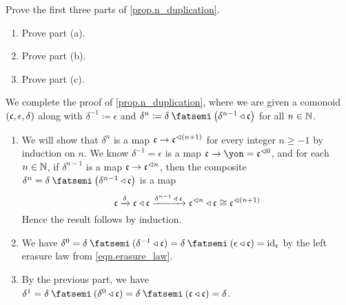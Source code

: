 \documentclass[Book-Poly]{subfiles}
\begin{document}
\begin{exercise} \label{exc.n_duplication}
Prove the first three parts of \cref{prop.n_duplication}. %
\begin{enumerate}
    \item Prove part (a).
    \item Prove part (b).
    \item Prove part (c).\qedhere
\end{enumerate}
\begin{solution}
We complete the proof of \cref{prop.n_duplication}, where we are given a comonoid $(\mathfrak{c},\epsilon,\delta)$ along with $\delta^{-1}\coloneqq\epsilon$ and $\delta^n\coloneqq\delta\then\left(\delta^{n-1}\tri\ema{c}\right)$ for all $n\in\mathbb{N}$.
\begin{enumerate}
    \item We will show that $\delta^n$ is a map $\mathfrak{c}\to\mathfrak{c}^{\lhd (n+1)}$ for every integer $n\geq-1$ by induction on $n$.
    We know $\delta^{-1}=\epsilon$ is a map $\ema{c}\to\yon=\ema{c}\tripow0$, and for each $n\in\mathbb{N}$, if $\delta^{n-1}$ is a map $\mathfrak{c}\to\mathfrak{c}^{\lhd n}$, then the composite $\delta^n=\delta\then\left(\delta^{n-1}\tri\ema{c}\right)$ is a map
    \[
        \mathfrak{c}\xrightarrow{\delta}\mathfrak{c}\mathbin{\triangleleft}\mathfrak{c}\xrightarrow{\delta^{n-1}\:\mathbin{\triangleleft}\:\mathfrak{c}}\mathfrak{c}^{\lhd n}\mathbin{\triangleleft}\mathfrak{c}\cong\mathfrak{c}^{\lhd (n+1)}
    \]
    Hence the result follows by induction.
    
    \item We have $\delta^0=\delta\then(\delta^{-1}\tri\ema{c})=\delta\then(\epsilon\tri\ema{c})=\id_\ema{c}$ by the left erasure law from \eqref{eqn.erasure_law}.
    
    \item By the previous part, we have $\delta^1=\delta\then(\delta^0\tri\ema{c})=\delta\then(\ema{c}\tri\ema{c})=\delta$.
\end{enumerate}
\end{solution}
\end{exercise}
\end{document}
